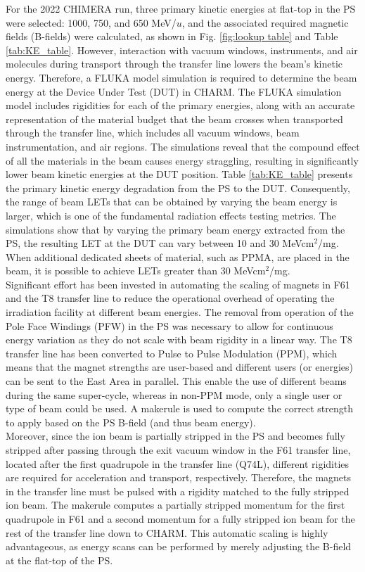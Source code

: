 \documentclass{cernatsnote}
\begin{document}
For the 2022 CHIMERA run, three primary kinetic energies at flat-top in the PS were selected: 1000, 750, and 650 MeV/$u$, and the associated required magnetic fields (B-fields) were calculated, as shown in Fig. \ref{fig:lookup table} and Table \ref{tab:KE_table}. However, interaction with vacuum windows, instruments, and air molecules during transport through the transfer line lowers the beam's kinetic energy. Therefore, a FLUKA model simulation is required to determine the beam energy at the Device Under Test (DUT) in CHARM. The FLUKA simulation model includes rigidities for each of the primary energies, along with an accurate representation of the material budget that the beam crosses when transported through the transfer line, which includes all vacuum windows, beam instrumentation, and air regions. The simulations reveal that the compound effect of all the materials in the beam causes energy straggling, resulting in significantly lower beam kinetic energies at the DUT position. Table \ref{tab:KE_table} presents the primary kinetic energy degradation from the PS to the DUT. Consequently, the range of beam LETs that can be obtained by varying the beam energy is larger, which is one of the fundamental radiation effects testing metrics. The simulations show that by varying the primary beam energy extracted from the PS, the resulting LET at the DUT can vary between 10 and 30 MeVcm$^2$/mg. When additional dedicated sheets of material, such as PPMA, are placed in the beam, it is possible to achieve LETs greater than 30 MeVcm$^2$/mg.
\\

Significant effort has been invested in automating the scaling of magnets in F61 and the T8 transfer line to reduce the operational overhead of operating the irradiation facility at different beam energies. The removal from operation of the Pole Face Windings (PFW) in the PS was necessary to allow for continuous energy variation as they do not scale with beam rigidity in a linear way. The T8 transfer line has been converted to Pulse to Pulse Modulation (PPM), which means that the magnet strengths are user-based and different users (or energies) can be sent to the East Area in parallel. This enable the use of different beams during the same super-cycle, whereas in non-PPM mode, only a single user or type of beam could be used. A makerule is used to compute the correct strength to apply based on the PS B-field (and thus beam energy).
\\

Moreover, since the ion beam is partially stripped in the PS and becomes fully stripped after passing through the exit vacuum window in the F61 transfer line, located after the first quadrupole in the transfer line (Q74L), different rigidities are required for acceleration and transport, respectively. Therefore, the magnets in the transfer line must be pulsed with a rigidity matched to the fully stripped ion beam. The makerule computes a partially stripped momentum for the first quadrupole in F61 and a second momentum for a fully stripped ion beam for the rest of the transfer line down to CHARM. This automatic scaling is highly advantageous, as energy scans can be performed by merely adjusting the B-field at the flat-top of the PS.
\\
\end{document}
